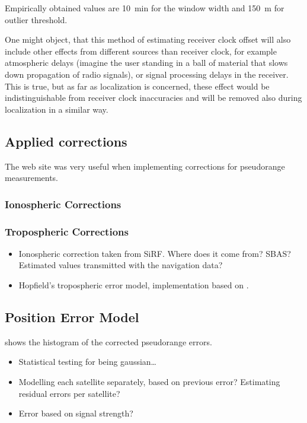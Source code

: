 Empirically obtained values are \SI{10}{\minute} for the window width and
\SI{150}{\meter} for outlier threshold.

One might object, that this method of estimating receiver clock offset will
also include other effects from different sources than receiver clock,
for example atmospheric delays (imagine the user standing in a ball of material
that slows down propagation of radio signals), or signal processing delays
in the receiver.
This is true, but as far as localization is concerned, these effect would
be indistinguishable from receiver clock inaccuracies and will be
removed also during localization in a similar way.

\subsection{Applied corrections}
\label{sec:impl-corrections}
The web site \cite{sam-www} was very useful when implementing corrections for
pseudorange measurements.

\subsubsection{Ionospheric Corrections}

\subsubsection{Tropospheric Corrections}
\begin{itemize}
\item Ionospheric correction taken from SiRF. Where does it come from? SBAS?
    Estimated values transmitted with the navigation data?
\item Hopfield's tropospheric error model, implementation based on \cite{sam-www}.
\end{itemize}

\subsection{Position Error Model}
 shows the histogram of the corrected pseudorange
errors.
\begin{itemize}
\item Statistical testing for being gaussian\ldots
\item Modelling each satellite separately, based on previous error?
      Estimating residual errors per satellite?
\item Error based on signal strength?
\end{itemize}

